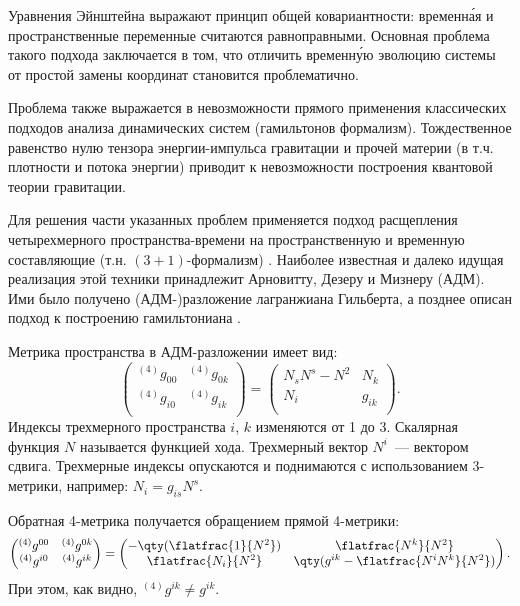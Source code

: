 \documentclass[\docroot/reports/draft/report.tex]{subfiles}
\begin{document}
    Уравнения Эйнштейна выражают принцип общей ковариантности: временн\'{а}я и пространственные переменные считаются равноправными. Основная проблема такого подхода заключается в том, что отличить временн\'{у}ю эволюцию системы от простой замены координат становится проблематично.

    Проблема также выражается в невозможности прямого применения классических подходов анализа динамических систем (гамильтонов формализм). Тождественное равенство нулю тензора энергии-импульса гравитации и прочей материи (в т.ч. плотности и потока энергии) приводит к невозможности построения квантовой теории гравитации.

    Для решения части указанных проблем применяется подход расщепления четырехмерного пространства-времени на пространственную и временную составляющие (т.н. $(3+1)$-формализм) \cite{mtw_v2}. Наиболее известная и далеко идущая реализация этой техники принадлежит Арновитту, Дезеру и Мизнеру (АДМ). Ими было получено (АДМ-)разложение лагранжиана Гильберта, а позднее описан подход к построению гамильтониана \cite{adm_gr_dyn}.

    Метрика пространства в АДМ-разложении имеет вид:
    \begin{equation*}
        \begin{pmatrix}
            {}^{(4)}g_{00} & {}^{(4)}g_{0k} \\
            {}^{(4)}g_{i0} & {}^{(4)}g_{ik} \\
        \end{pmatrix} =
        \begin{pmatrix}
            N_s N^s - N^2  & N_k    \\
            N_i            & g_{ik} \\
        \end{pmatrix} .
    \end{equation*}
    Индексы трехмерного пространства $i$, $k$ изменяются от 1 до 3. Скалярная функция $N$ называется функцией хода. Трехмерный вектор $N^i$~--- вектором сдвига. Трехмерные индексы опускаются и поднимаются с использованием 3-метрики, например: $N_i = g_{is} N^s$.

    Обратная 4-метрика получается обращением прямой 4-метрики:
    \begin{equation*}
        \begin{pmatrix}
            {}^{(4)}g^{00} & {}^{(4)}g^{0k} \\
            {}^{(4)}g^{i0} & {}^{(4)}g^{ik} \\
        \end{pmatrix} =
        \begin{pmatrix}
            - \qty(\flatfrac{1}{N^2})  & \flatfrac{N^k}{N^2} \\
            \flatfrac{N_i}{N^2}        & \qty(g^{ik} - \flatfrac{N^i N^k}{N^2}) \\
        \end{pmatrix} .
    \end{equation*}
    При этом, как видно, ${}^{(4)}g^{ik} \neq g^{ik}$.
\end{document}
